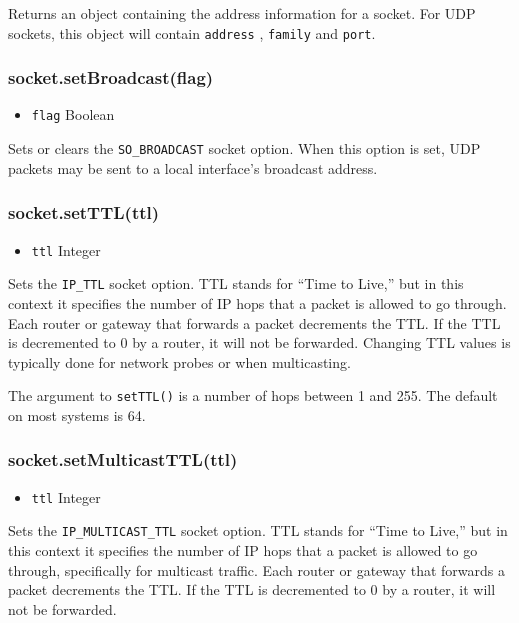 Returns an object containing the address information for a socket. For
UDP sockets, this object will contain \texttt{address} , \texttt{family}
and \texttt{port}.

\subsubsection{socket.setBroadcast(flag)}\label{socket.setbroadcastflag}

\begin{itemize}
\itemsep1pt\parskip0pt
\item
  \texttt{flag} Boolean
\end{itemize}

Sets or clears the \texttt{SO\_BROADCAST} socket option. When this
option is set, UDP packets may be sent to a local interface's broadcast
address.

\subsubsection{socket.setTTL(ttl)}\label{socket.setttlttl}

\begin{itemize}
\itemsep1pt\parskip0pt
\item
  \texttt{ttl} Integer
\end{itemize}

Sets the \texttt{IP\_TTL} socket option. TTL stands for ``Time to
Live,'' but in this context it specifies the number of IP hops that a
packet is allowed to go through. Each router or gateway that forwards a
packet decrements the TTL. If the TTL is decremented to 0 by a router,
it will not be forwarded. Changing TTL values is typically done for
network probes or when multicasting.

The argument to \texttt{setTTL()} is a number of hops between 1 and 255.
The default on most systems is 64.

\subsubsection{socket.setMulticastTTL(ttl)}\label{socket.setmulticastttlttl}

\begin{itemize}
\itemsep1pt\parskip0pt
\item
  \texttt{ttl} Integer
\end{itemize}

Sets the \texttt{IP\_MULTICAST\_TTL} socket option. TTL stands for
``Time to Live,'' but in this context it specifies the number of IP hops
that a packet is allowed to go through, specifically for multicast
traffic. Each router or gateway that forwards a packet decrements the
TTL. If the TTL is decremented to 0 by a router, it will not be
forwarded.

